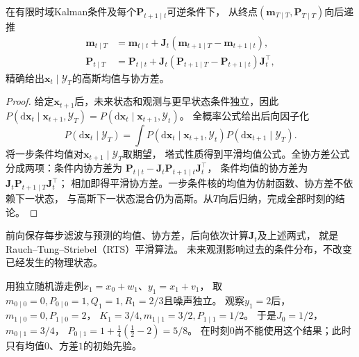 \begin{theorem}[有限时域RTS平滑]
 \label{thm:dynamical-rts-smoother}
 在有限时域Kalman条件及每个$\bm P_{t+1\mid t}$可逆条件下，
 从终点$(\bm m_{T\mid T},\bm P_{T\mid T})$向后递推
 \begin{align}
  \bm m_{t\mid T}
   &=\bm m_{t\mid t}+\bm J_t(\bm m_{t+1\mid T}-\bm m_{t+1\mid t}),
       \label{eq:dynamical-rts-smoothed-mean}\\
  \bm P_{t\mid T}
   &=\bm P_{t\mid t}
         +\bm J_t(\bm P_{t+1\mid T}-\bm P_{t+1\mid t})\bm J_t^\top,
       \label{eq:dynamical-rts-smoothed-covariance}
 \end{align}
 精确给出$\bm x_t\mid\mathcal Y_T$的高斯均值与协方差。
\end{theorem}
\begin{proof}
 给定$\bm x_{t+1}$后，未来状态和观测与更早状态条件独立，因此
 $P(\mathrm d\bm x_t\mid\bm x_{t+1},\mathcal Y_T)
   =P(\mathrm d\bm x_t\mid\bm x_{t+1},\mathcal Y_t)$。
 全概率公式给出后向因子化
 \begin{equation}
  P(\mathrm d\bm x_t\mid\mathcal Y_T)
   =\int P(\mathrm d\bm x_t\mid\bm x_{t+1},\mathcal Y_t)
                   P(\mathrm d\bm x_{t+1}\mid\mathcal Y_T).
  \label{eq:dynamical-rts-backward-factorization}
 \end{equation}
 将一步条件均值对$\bm x_{t+1}\mid\mathcal Y_T$取期望，
 塔式性质得到平滑均值公式。全协方差公式分成两项：条件内协方差为
 $\bm P_{t\mid t}-\bm J_t\bm P_{t+1\mid t}\bm J_t^\top$，
 条件均值的协方差为$\bm J_t\bm P_{t+1\mid T}\bm J_t^\top$；
 相加即得平滑协方差。一步条件核的均值为仿射函数、协方差不依赖下一状态，
 与高斯下一状态混合仍为高斯。从$T$向后归纳，完成全部时刻的结论。
\end{proof}

前向保存每步滤波与预测的均值、协方差，后向依次计算$\bm J_t$及上述两式，
就是Rauch--Tung--Striebel（RTS）平滑算法。
未来观测影响过去的条件分布，不改变已经发生的物理状态。

\begin{example}[未来观测降低过去状态的不确定性]
 \label{ex:dynamical-scalar-rts-update}
 用独立随机游走例$x_1=x_0+w_1$、$y_1=x_1+v_1$，
 取$m_{0\mid0}=0,P_{0\mid0}=1,Q_1=1,R_1=2/3$且噪声独立。
 观察$y_1=2$后，$m_{1\mid0}=0,P_{1\mid0}=2$，
 $K_1=3/4,m_{1\mid1}=3/2,P_{1\mid1}=1/2$。
 于是$J_0=1/2$，$m_{0\mid1}=3/4$，
 $P_{0\mid1}=1+\frac14(\frac12-2)=5/8$。
 在时刻$0$尚不能使用这个结果；此时只有均值$0$、方差$1$的初始先验。
\end{example}

